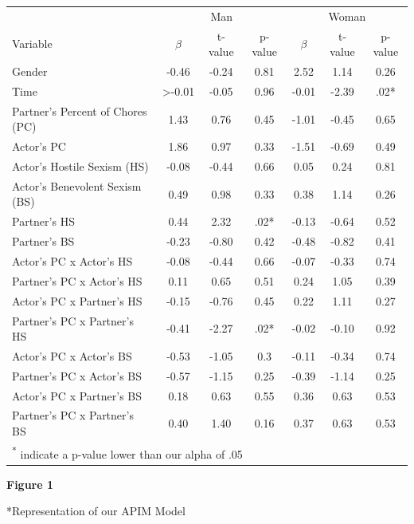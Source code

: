 \documentclass[
  english,
  man]{apa6}
\begin{document}
\begin{tabular}{lcccccc}
\toprule
\multicolumn{1}{c}{ } & \multicolumn{3}{c}{Man} & \multicolumn{3}{c}{Woman} \\
\cmidrule(l{3pt}r{3pt}){2-4} \cmidrule(l{3pt}r{3pt}){5-7}
Variable & $\beta$ & t-value & p-value & $\beta$ & t-value & p-value\\
\midrule
Gender & -0.46 & -0.24 & 0.81 & 2.52 & 1.14 & 0.26\\
Time & >-0.01 & -0.05 & 0.96 & -0.01 & -2.39 & .02*\\
Partner's Percent of Chores (PC) & 1.43 & 0.76 & 0.45 & -1.01 & -0.45 & 0.65\\
Actor's PC & 1.86 & 0.97 & 0.33 & -1.51 & -0.69 & 0.49\\
Actor's Hostile Sexism (HS) & -0.08 & -0.44 & 0.66 & 0.05 & 0.24 & 0.81\\
\addlinespace
Actor's Benevolent Sexism (BS) & 0.49 & 0.98 & 0.33 & 0.38 & 1.14 & 0.26\\
Partner's HS & 0.44 & 2.32 & .02* & -0.13 & -0.64 & 0.52\\
Partner's BS & -0.23 & -0.80 & 0.42 & -0.48 & -0.82 & 0.41\\
Actor's PC x Actor's HS & -0.08 & -0.44 & 0.66 & -0.07 & -0.33 & 0.74\\
Partner's PC x Actor's HS & 0.11 & 0.65 & 0.51 & 0.24 & 1.05 & 0.39\\
\addlinespace
Actor's PC x Partner's HS & -0.15 & -0.76 & 0.45 & 0.22 & 1.11 & 0.27\\
Partner's PC x Partner's HS & -0.41 & -2.27 & .02* & -0.02 & -0.10 & 0.92\\
Actor's PC x Actor's BS & -0.53 & -1.05 & 0.3 & -0.11 & -0.34 & 0.74\\
Partner's PC x Actor's BS & -0.57 & -1.15 & 0.25 & -0.39 & -1.14 & 0.25\\
Actor's PC x Partner's BS & 0.18 & 0.63 & 0.55 & 0.36 & 0.63 & 0.53\\
\addlinespace
Partner's PC x Partner's BS & 0.40 & 1.40 & 0.16 & 0.37 & 0.63 & 0.53\\
\bottomrule
\multicolumn{7}{l}{\textsuperscript{*} indicate a p-value lower than our alpha of .05}\\
\end{tabular}

\newpage

\textbf{Figure 1}

*Representation of our APIM Model
\end{document}
